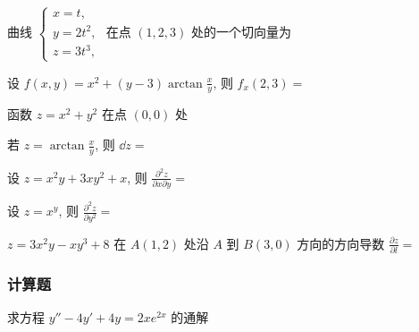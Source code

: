 \begin{ti}
	曲线 $\begin{cases}
		x = t, \\
		y = 2t^2, \\
		z = 3t^3,
	\end{cases}$ 在点 $(1,2,3)$ 处的一个切向量为 \kuo
\end{ti}

\begin{ti}
	设 $f(x,y) = x^2 + (y-3) \arctan \frac{x}{y}$, 则 $f_x(2,3) = $ \kuo
\end{ti}

\begin{ti}
	函数 $z = x^2 + y^2$ 在点 $(0,0)$ 处 \kuo
\end{ti}

\begin{ti}
	若 $z = \arctan \frac{x}{y}$, 则 $\dd{z} = $ \kuo
\end{ti}

\begin{ti}
	设 $z = x^2 y + 3x y^2 + x$, 则 $\frac{\partial^2 z}{\partial x \partial y} = $ \kuo
\end{ti}

\begin{ti}
	设 $z = x^y$, 则 $\frac{\partial^2 z}{\partial y^2} = $ \kuo
\end{ti}

\begin{ti}
	$z = 3x^2y - xy^3 + 8$ 在 $A(1,2)$ 处沿 $A$ 到 $B(3,0)$ 方向的方向导数 $\frac{\partial z}{\partial l} = $ \kuo
\end{ti}

\subsubsection{计算题}
\begin{ti}
	求方程 $y'' - 4y' + 4y = 2xe^{2x}$ 的通解
\end{ti}

